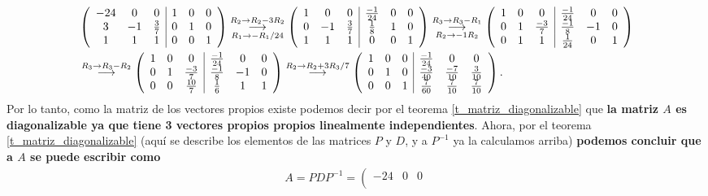 \documentclass[11pt,letterpaper]{article}
\newcommand{\grstep}[2][\relax]{%
   \ensuremath{\mathrel{
       {\mathop{\longrightarrow}\limits^{#2\mathstrut}_{
                                     \begin{subarray}{l} #1 \end{subarray}}}}}}
\begin{document}
\begin{enumerate}
\begin{align*}
&\left(\begin{array}{ccc|ccc}
-24 & 0 & 0 & 1 & 0 & 0 \\
3 & -1 & \frac{3}{7} & 0 & 1 & 0 \\
1 & 1 & 1 & 0 & 0 & 1
\end{array}\right)%
\grstep[R_1\rightarrow -R_1/24]{R_2 \rightarrow R_2-3R_2}
%
\left(\begin{array}{ccc|ccc}
1 & 0 & 0 & \frac{-1}{24} & 0 & 0 \\
0 & -1 & \frac{3}{7} & \frac{1}{8} & 1 & 0 \\
1 & 1 & 1 & 0 & 0 & 1
\end{array}\right)%
\grstep[R_2\rightarrow -1R_2]{R_3 \rightarrow R_3-R_1}
%
\left(\begin{array}{ccc|ccc}
1 & 0 & 0 & \frac{-1}{24} & 0 & 0 \\
0 & 1 & \frac{-3}{7} & \frac{-1}{8} & -1 & 0 \\
0 & 1 & 1 & \frac{1}{24} & 0 & 1
\end{array}\right)\\
&\grstep[]{R_3 \rightarrow R_3-R_2}
%
\left(\begin{array}{ccc|ccc}
1 & 0 & 0 & \frac{-1}{24} & 0 & 0 \\
0 & 1 & \frac{-3}{7} & \frac{-1}{8} & -1 & 0 \\
0 & 0 & \frac{10}{7} & \frac{1}{6} & 1 & 1
\end{array}\right)%
\grstep[]{R_2 \rightarrow R_2+3R_3/7}
%
\left(\begin{array}{ccc|ccc}
1 & 0 & 0 & \frac{-1}{24} & 0 & 0 \\
0 & 1 & 0 & \frac{-3}{40} & \frac{-7}{10} & \frac{3}{10} \\
0 & 0 & 1 & \frac{7}{60} & \frac{7}{10} & \frac{7}{10}
\end{array}\right).
\end{align*}
Por lo tanto, como la matriz de los vectores propios existe podemos decir por el teorema \ref{t_matriz_diagonalizable} que \textbf{la matriz $A$ es diagonalizable ya que tiene 3 vectores propios propios linealmente independientes}. Ahora, por el teorema \ref{t_matriz_diagonalizable} (aquí se describe los elementos de las matrices $P$ y $D$, y a $P^{-1}$ ya la calculamos arriba) \textbf{podemos concluir que a $A$ se puede escribir como}
\begin{align*}
A=PDP^{-1}=\left(\begin{matrix}
-24 & 0 & 0 \\

\end{matrix}
\end{align*}
\end{enumerate}
\end{document}

